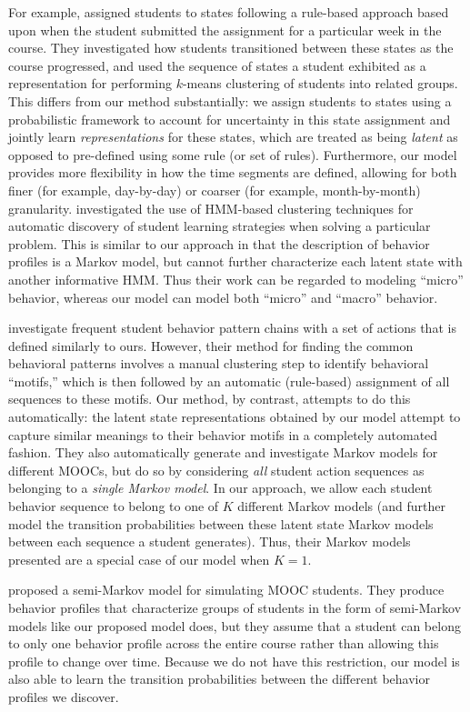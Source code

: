 For example, \citet{Kizilcec:2013:LAK} assigned students to states
following a rule-based approach based upon when the student submitted the
assignment for a particular week in the course. They investigated how
students transitioned between these states as the course progressed, and
used the sequence of states a student exhibited as a representation for
performing $k$-means clustering of students into related groups. This
differs from our method substantially: we assign students to states using a
probabilistic framework to account for uncertainty in this state
assignment and jointly learn \emph{representations} for these states,
which are treated as being \emph{latent} as opposed to pre-defined using
some rule (or set of rules).  Furthermore, our model provides more
flexibility in how the time segments are defined, allowing for both finer
(for example, day-by-day) or coarser (for example, month-by-month)
granularity. \citet{Shih:2010:EDM} investigated the use of HMM-based
clustering techniques for automatic discovery of student learning
strategies when solving a particular problem.  This is similar to our
approach in that the description of behavior profiles is a Markov model,
but cannot further characterize each latent state with another informative
HMM. Thus their work can be regarded to modeling ``micro'' behavior,
whereas our model can model both ``micro'' and ``macro'' behavior.

\citet{Davis:2016:EDM} investigate frequent student behavior pattern chains
with a set of actions that is defined similarly to ours. However, their
method for finding the common behavioral patterns involves a manual
clustering step to identify behavioral ``motifs,'' which is then followed
by an automatic (rule-based) assignment of all sequences to these motifs.
Our method, by contrast, attempts to do this automatically: the latent
state representations obtained by our model attempt to capture similar
meanings to their behavior motifs in a completely automated fashion. They
also automatically generate and investigate Markov models for different
MOOCs, but do so by considering \emph{all} student action sequences as
belonging to a \emph{single Markov model}. In our approach, we allow each
student behavior sequence to belong to one of $K$ different Markov models
(and further model the transition probabilities between these latent state
Markov models between each sequence a student generates). Thus, their
Markov models presented are a special case of our model when $K = 1$.

\citet{Faucon:2016:EDM} proposed a semi-Markov model for simulating MOOC
students. They produce behavior profiles that characterize groups of
students in the form of semi-Markov models like our proposed model does,
but they assume that a student can belong to only one behavior profile
across the entire course rather than allowing this profile to change over
time. Because we do not have this restriction, our model is also able to
learn the transition probabilities between the different behavior profiles
we discover.

